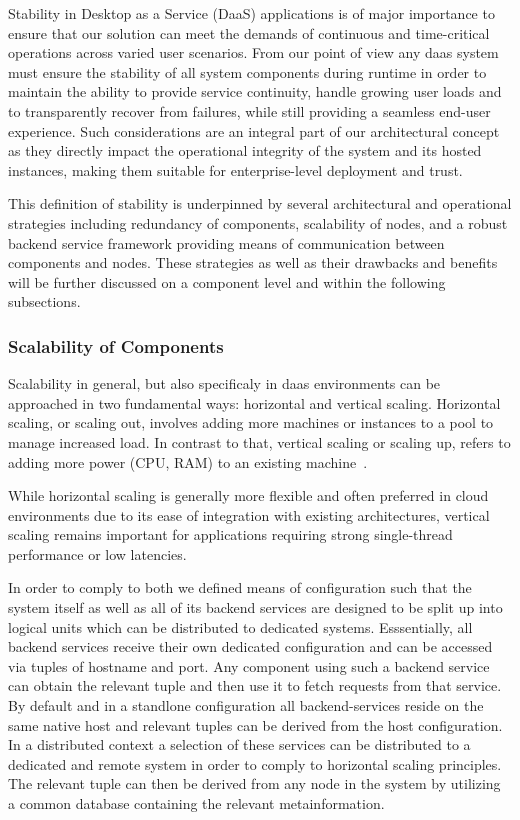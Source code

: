 \documentclass[runningheads]{llncs}
\begin{document}
Stability in Desktop as a Service (DaaS) applications is of major importance
to ensure that our solution can meet the demands of continuous
and time-critical operations across varied user scenarios.
From our point of view any daas system must ensure the stability
of all system components during runtime
in order to maintain the ability to provide service continuity,
handle growing user loads and to transparently recover from failures,
while still providing a seamless end-user experience.
Such considerations are an integral part of our architectural concept
as they directly impact the operational integrity
of the system and its hosted instances,
making them suitable for enterprise-level deployment and trust.

This definition of stability is underpinned by several architectural
and operational strategies including redundancy of components, scalability of nodes,
and a robust backend service framework
providing means of communication between components and nodes.
These strategies as well as their drawbacks and benefits
will be further discussed on a component level
and within the following subsections.

\subsubsection{Scalability of Components}
Scalability in general, but also specificaly in daas environments
can be approached in two fundamental ways:
horizontal and vertical scaling.
Horizontal scaling, or scaling out, involves adding more machines or instances
to a pool to manage increased load.
In contrast to that, vertical scaling or scaling up,
refers to adding more power (CPU, RAM)
to an existing machine~\cite{vaquero2011dynamically}.

While horizontal scaling is generally more flexible
and often preferred in cloud environments
due to its ease of integration with existing architectures,
vertical scaling remains important for applications
requiring strong single-thread performance or low latencies.

In order to comply to both we defined means of configuration
such that the system itself as well as all of its backend services
are designed to be split up into logical units
which can be distributed to dedicated systems.
Esssentially, all backend services receive their own dedicated configuration
and can be accessed via tuples of hostname and port.
Any component using such a backend service can obtain the relevant tuple
and then use it to fetch requests from that service.
By default and in a standlone configuration
all backend-services reside on the same native host
and relevant tuples can be derived from the host configuration.
In a distributed context a selection of these services
can be distributed to a dedicated and remote system
in order to comply to horizontal scaling principles.
The relevant tuple can then be derived from any node in the system
by utilizing a common database containing the relevant metainformation.
\end{document}
